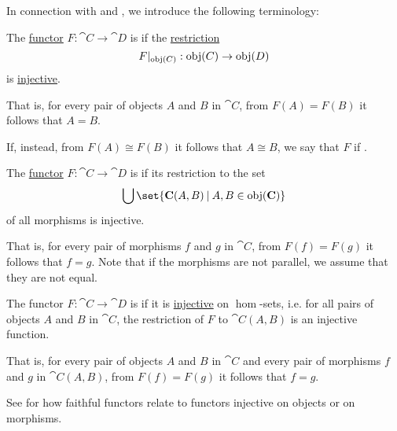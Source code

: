 \begin{definition}\label{def:functor_invertibility}
  In connection with  and , we introduce the following terminology:
  \begin{thmenum}
     The \hyperref[def:functor]{functor} \( F: \cat{C} \to \cat{D} \) is  if the \hyperref[def:multi_valued_function/restriction]{restriction}
    \begin{equation*}
      F\vert_{\operatorname{obj}(C)}: \operatorname{obj}(C) \to \operatorname{obj}(D)
    \end{equation*}
    is \hyperref[def:function_invertibility/injective]{injective}.

    That is, for every pair of objects \( A \) and \( B \) in \( \cat{C} \), from \( F(A) = F(B) \) it follows that \( A = B \).

    If, instead, from \( F(A) \cong F(B) \) it follows that \( A \cong B \), we say that \( F \) if .

     The \hyperref[def:functor]{functor} \( F: \cat{C} \to \cat{D} \) is  if its restriction to the set
    \begin{equation*}
      \bigcup\set{ \cat{C}(A, B) \given A, B \in \obj(\cat{C}) }
    \end{equation*}
    of all morphisms is injective.

    That is, for every pair of morphisms \( f \) and \( g \) in \( \cat{C} \), from \( F(f) = F(g) \) it follows that \( f = g \). Note that if the morphisms are not parallel, we assume that they are not equal.

     The functor \( F: \cat{C} \to \cat{D} \) is  if it is \hyperref[def:function_invertibility/injective]{injective} on \( \hom \)-sets, i.e. for all pairs of objects \( A \) and \( B \) in \( \cat{C} \), the restriction of \( F \) to \( \cat{C}(A, B) \) is an injective function.

    That is, for every pair of objects \( A \) and \( B \) in \( \cat{C} \) and every pair of morphisms \( f \) and \( g \) in \( \cat{C}(A, B) \), from \( F(f) = F(g) \) it follows that \( f = g \).

    See  for how faithful functors relate to functors injective on objects or on morphisms.


\end{thmenum}
\end{definition}
